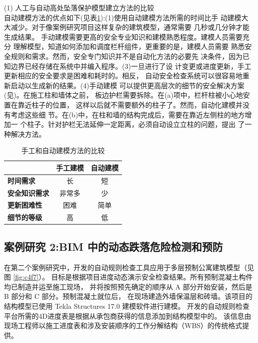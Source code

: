(1) 人工与自动高处坠落保护模型建立方法的比较\\

自动建模方法的优点如下(见表\ref{tb:compare}):(1)使用自动建模方法所需的时间比手
动建模大大减少。对于像案例研究项目这样复杂的建筑模型，通常需要
几秒或几分钟才能生成结果。
手动建模需要更高的安全专业知识和建模熟悉程度。建模人员需要充分
理解模型，知道如何添加和调度栏杆组件，更重要的是，建模人员需要
熟悉安全规则和需求。然而，安全专门知识并不是自动化方法的必要先
决条件，因为已知边界已经存储在系统中并编入程序。(3)一旦进行了设
计变更或进度更新，手工更新相应的安全要求是困难和耗时的。相反，
自动安全检查系统可以很容易地重新启动以生成新的结果。(4)手动建模
可以提供更高层次的细节的安全解决方案(见)。在施工柱和墙体之前，
板边护栏需要拆除。在(a)项中，栏杆柱被小心地安置在靠近柱子的位置，
这样以后就不需要额外的柱子了。然而，自动化建模并没有考虑这些细
节。在(b)中，在柱和墙的结构完成后，需要在靠近左侧柱的地方增加一
个柱子。针对护栏无法延伸一定距离，必须自动设立立柱的问题，提出
了一种解决方法。

\begin{table}[thbp]
    \caption{手工和自动建模方法的比较}
    \begin{center}
        \begin{tabular}{@{}lcc@{}}
            \toprule
            \multicolumn{1}{c}{\textbf{}} & \textbf{手工建模} & \textbf{自动建模} \\ \midrule
            \textbf{时间需求} & 长 & 短 \\
            \textbf{安全知识需求} & 非常多 & 少 \\
            \textbf{更新困难性} & 困难 & 简单 \\
            \textbf{细节的等级} & 高 & 低 \\ \bottomrule
            \end{tabular}
    \end{center}
    \label{tb:compare}
    \end{table}

\subsection{案例研究 2:BIM 中的动态跌落危险检测和预防}

在第二个案例研究中，开发的自动规则检查工具应用于多层预制公寓建筑模型（见图 \ref{fig:c4f7}）。
目标是根据项目进度动态演示安全检查结果。所有预制混凝土构件均已制造并运至施工现场，
并将按照预先确定的顺序从 A 部分开始安装，然后是 B 部分和 C 部分。预制混凝土就位后，
在现场建造外墙保温层和砖墙。该项目的结构模型已使用 Tekla Structures 17.0 建模软件进行建模。
开发的自动规则检查平台所需的4D进度表是根据从承包商获得的信息添加到结构模型中的。
该信息由现场工程师以施工进度表和涉及安装顺序的工作分解结构（WBS）的传统格式提供。

